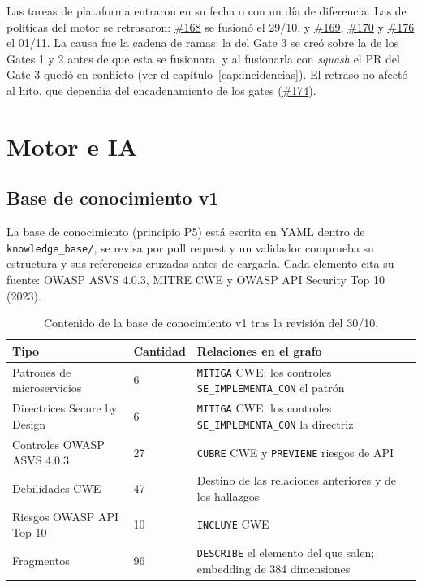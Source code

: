 \documentclass[11pt,a4paper]{report}
\newcommand{\pr}[1]{\href{https://github.com/PracticasESPE/Framework_Desarrollo_Seguro/pull/#1}{\##1}}
\begin{document}
Las tareas de plataforma entraron en su fecha o con un día de diferencia. Las de políticas del
motor se retrasaron: \pr{168} se fusionó el 29/10, y \pr{169}, \pr{170} y \pr{176} el 01/11. La
causa fue la cadena de ramas: la del Gate 3 se creó sobre la de los Gates 1 y 2 antes de que esta
se fusionara, y al fusionarla con \emph{squash} el PR del Gate 3 quedó en conflicto (ver el
capítulo~\ref{cap:incidencias}). El retraso no afectó al hito, que dependía del encadenamiento de
los gates (\pr{174}).

\section{Motor e IA}

\subsection{Base de conocimiento v1}
La base de conocimiento (principio P5) está escrita en YAML dentro de \texttt{knowledge\_base/},
se revisa por pull request y un validador comprueba su estructura y sus referencias cruzadas
antes de cargarla. Cada elemento cita su fuente: OWASP ASVS 4.0.3, MITRE CWE y OWASP API Security
Top 10 (2023).

\begin{table}[H]
\centering
\caption{Contenido de la base de conocimiento v1 tras la revisión del 30/10.}
\begin{tabularx}{\textwidth}{@{}P{3.6cm}P{1.4cm}L@{}}
\toprule
\textbf{Tipo} & \textbf{Cantidad} & \textbf{Relaciones en el grafo}\\
\midrule
Patrones de microservicios & 6 & \texttt{MITIGA} CWE; los controles \texttt{SE\_IMPLEMENTA\_CON} el patrón\\
Directrices Secure by Design & 6 & \texttt{MITIGA} CWE; los controles \texttt{SE\_IMPLEMENTA\_CON} la directriz\\
Controles OWASP ASVS 4.0.3 & 27 & \texttt{CUBRE} CWE y \texttt{PREVIENE} riesgos de API\\
Debilidades CWE & 47 & Destino de las relaciones anteriores y de los hallazgos\\
Riesgos OWASP API Top 10 & 10 & \texttt{INCLUYE} CWE\\
Fragmentos & 96 & \texttt{DESCRIBE} el elemento del que salen; embedding de 384 dimensiones\\
\bottomrule
\end{tabularx}
\end{table}
\end{document}
